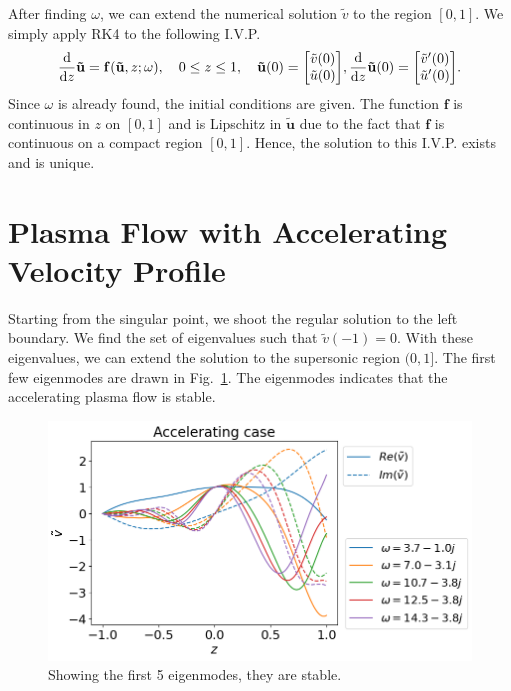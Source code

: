 After finding $\omega$, we can extend the numerical solution $\tilde{v}$ to the region $[0,1]$. We simply apply RK4 to the following I.V.P.
\begin{equation}
	\dv{z}\mathbf{\tilde{u}} = \mathbf{f}(\mathbf{\tilde{u}},z;\omega), \quad
	0 \leq z \leq 1, \quad
	\mathbf{\tilde{u}}(0)=\mqty[\tilde{v}(0) \\ \tilde{u}(0)], \dv{z}\mathbf{\tilde{u}}(0) =\mqty[\tilde{v}'(0) \\ \tilde{u}'(0)].
\end{equation}
Since $\omega$ is already found, the initial conditions are given. The function $\mathbf{f}$ is continuous in $z$ on $[0,1]$ and is Lipschitz in $\mathbf{\tilde{u}}$ due to the fact that $\mathbf{f}$ is continuous on a compact region $[0,1]$. Hence, the solution to this I.V.P. exists and is unique.


\section{Plasma Flow with Accelerating Velocity Profile}
Starting from the singular point, we shoot the regular solution to the left boundary. We find the set of eigenvalues such that $\tilde{v}(-1)=0$. With these eigenvalues, we can extend the solution to the supersonic region $(0,1]$. The first few eigenmodes are drawn in Fig.~\ref{fig:results-accelerating-v}. The eigenmodes indicates that the accelerating plasma flow is stable.
\begin{figure} [H]
	\centering
	\includegraphics[width=0.7\linewidth]{figures/results-accelerating-v}
	\caption{Showing the first 5 eigenmodes, they are stable.}
	\label{fig:results-accelerating-v}
\end{figure}
